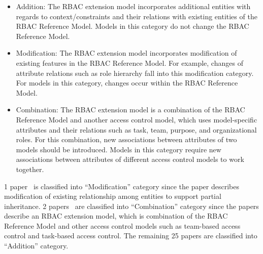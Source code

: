 \begin{itemize}
	\item Addition: The RBAC extension model incorporates additional entities with regards to context/constraints and their relations with existing entities of the RBAC Reference Model. Models in this category do not change the RBAC Reference Model.
	\item Modification: The RBAC extension model incorporates modification of existing features in the RBAC Reference Model. For example, changes of attribute relations such as role hierarchy fall into this modification category. For models in this category, changes occur within the RBAC Reference Model.
	\item Combination: The RBAC extension model is a combination of the RBAC Reference Model and another access control model, which uses model-specific attributes and their relations such as task, team, purpose, and organizational roles. For this combination, new associations between attributes of two models should be introduced. Models in this category require new associations between attributes of different access control models to work together. 
\end{itemize}

1 paper~\cite{alam06:constraint} is classified into ``Modification'' category since the paper describes modification of existing relationship among entities to support partial inheritance. 2 papers~\cite{zhou2007team, oh2003task} are classified into ``Combination'' category since the papers describe an RBAC extension model, which is combination of the RBAC Reference Model and other access control models such as team-based access control and task-based access control. The remaining 25 papers are classified into ``Addition'' category.


%
%
%

